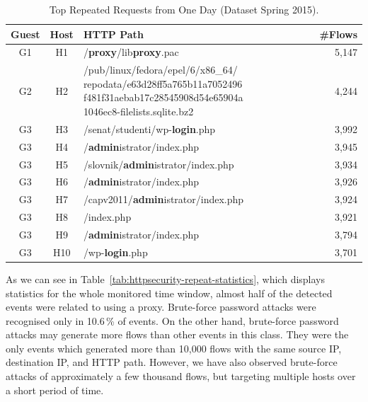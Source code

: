 \begin{table}[ht]
\centering
\begin{tabular}{| c | c | l | r|} \hline
Guest & Host & HTTP Path & \#Flows \\ \hline
G1  & H1 & /\textbf{proxy}/lib\textbf{proxy}.pac & 5,147 \\ \hline
G2  & H2 & \parbox[t]{6.3cm}{/pub/linux/fedora/epel/6/x86\_64/ repodata/e63d28ff5a765b11a7052496\\f481f31aebab17c28545908d54e65904a\\1046ec8-filelists.sqlite.bz2} & 4,244 \\ \hline
G3  & H3 & /senat/studenti/wp-\textbf{login}.php & 3,992 \\ \hline
G3  & H4 & /\textbf{admin}istrator/index.php & 3,945 \\ \hline
G3  & H5 & /slovnik/\textbf{admin}istrator/index.php & 3,934 \\ \hline
G3  & H6 & /\textbf{admin}istrator/index.php & 3,926 \\ \hline
G3  & H7 & /capv2011/\textbf{admin}istrator/index.php & 3,924 \\ \hline
G3  & H8 & /index.php & 3,921 \\ \hline
G3  & H9 & /\textbf{admin}istrator/index.php & 3,794 \\ \hline
G3  & H10 & /wp-\textbf{login}.php & 3,701 \\ \hline
\end{tabular}
\caption{Top Repeated Requests from One Day (Dataset Spring 2015).}
\label{tab:httpsecurity-repeat2}
\end{table}

As we can see in Table~\ref{tab:httpsecurity-repeat-statistics}, which displays statistics for the whole monitored time window, almost half of the detected events were related to using a proxy. Brute-force password attacks were recognised only in 10.6\,\% of events. On the other hand, brute-force password attacks may generate more flows than other events in this class. They were the only events which generated more than 10,000 flows with the same source IP, destination IP, and HTTP path. However, we have also observed brute-force attacks of approximately a few thousand flows, but targeting multiple hosts over a short period of time.

